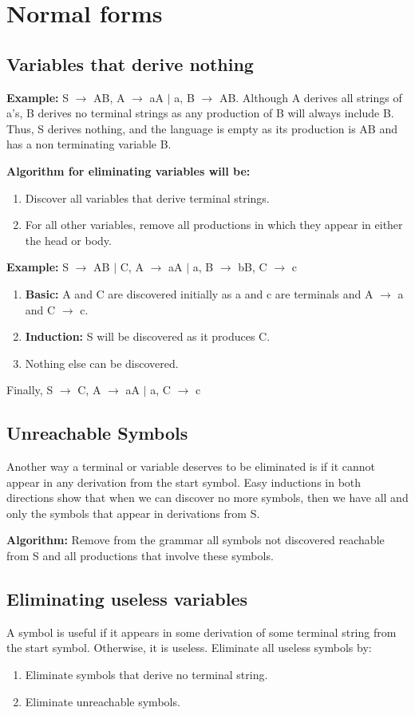 \documentclass{report}
\begin{document}
\section{Normal forms}
\subsection{Variables that derive nothing}
\textbf{Example:} S $\rightarrow$ AB, A $\rightarrow$ aA $|$ a, B $\rightarrow$ AB. Although A derives all strings of a’s, B derives no terminal strings as any production of B will always include B. Thus, S derives nothing, and the language is empty as its production is AB and has a non terminating variable B. \par
\textbf{Algorithm for eliminating variables will be:}
\begin{enumerate}
    \item Discover all variables that derive terminal strings.
    \item For all other variables, remove all productions in which they appear in either the head or body.
\end{enumerate}
\textbf{Example:} S $\rightarrow$ AB $|$ C, A $\rightarrow$ aA $|$ a, B $\rightarrow$ bB, C $\rightarrow$ c
\begin{enumerate}
    \item \textbf{Basic:} A and C are discovered initially as a and c are terminals and A $\rightarrow$ a and C $\rightarrow$ c.
    \item \textbf{Induction:} S will be discovered as it produces C.
    \item Nothing else can be discovered.
\end{enumerate}
Finally, S $\rightarrow$ C, A $\rightarrow$ aA $|$ a, C $\rightarrow$ c

\subsection{Unreachable Symbols}
Another way a terminal or variable deserves to be eliminated is if it cannot appear in any derivation from the start symbol. Easy inductions in both directions show
that when we can discover no more symbols, then we have all and only the symbols that appear in derivations from S. \par
\textbf{Algorithm:} Remove from the grammar all symbols not discovered reachable from S and all productions that involve these symbols. 

\subsection{Eliminating useless variables}
A symbol is useful if it appears in some derivation of some terminal string from the start symbol. Otherwise, it is useless.
Eliminate all useless symbols by:
\begin{enumerate}
    \item Eliminate symbols that derive no terminal string.
    \item Eliminate unreachable symbols. 
\end{enumerate}
\end{document}
